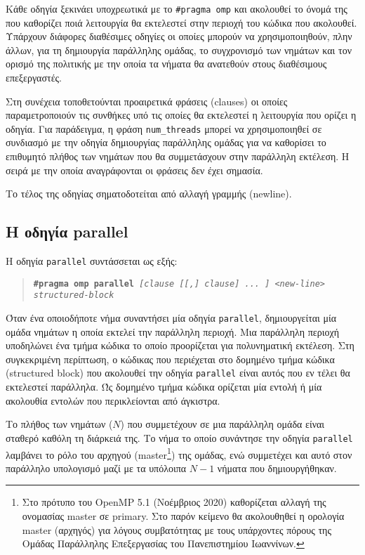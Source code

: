 Κάθε οδηγία ξεκινάει υποχρεωτικά με το \texttt{\#pragma omp} και ακολουθεί το όνομά της που καθορίζει ποιά λειτουργία θα εκτελεστεί στην περιοχή του κώδικα που ακολουθεί. Υπάρχουν διάφορες διαθέσιμες οδηγίες οι οποίες μπορούν να χρησιμοποιηθούν, πλην άλλων, για τη δημιουργία παράλληλης ομάδας, το συγχρονισμό των νημάτων και τον ορισμό της πολιτικής με την οποία τα νήματα θα ανατεθούν στους διαθέσιμους επεξεργαστές.

Στη συνέχεια τοποθετούνται προαιρετικά φράσεις (clauses) οι οποίες παραμετροποιούν τις συνθήκες υπό τις οποίες θα εκτελεστεί η λειτουργία που ορίζει η οδηγία. Για παράδειγμα, η φράση \texttt{num\_threads} μπορεί να χρησιμοποιηθεί σε συνδιασμό με την οδηγία δημιουργίας παράλληλης ομάδας για να καθορίσει το επιθυμητό πλήθος των νημάτων που θα συμμετάσχουν στην παράλληλη εκτέλεση. Η σειρά με την οποία αναγράφονται οι φράσεις δεν έχει σημασία.

Το τέλος της οδηγίας σηματοδοτείται από αλλαγή γραμμής (newline).

\subsection{Η οδηγία parallel}
Η οδηγία \texttt{parallel} συντάσσεται ως εξής:

\begin{quote}
	\texttt{\textbf{\#pragma omp parallel} \textit{[clause [[,] clause] ... ] <new-line>}} \\
		\texttt{\textit{structured-block}}
\end{quote}

Όταν ένα οποιοδήποτε νήμα συναντήσει μία οδηγία \texttt{parallel}, δημιουργείται μία ομάδα νημάτων η οποία εκτελεί την παράλληλη περιοχή. Μια παράλληλη περιοχή υποδηλώνει ένα τμήμα κώδικα το οποίο προορίζεται για πολυνηματική εκτέλεση. Στη συγκεκριμένη περίπτωση, ο κώδικας που περιέχεται στο δομημένο τμήμα κώδικα (structured block) που ακολουθεί την οδηγία \texttt{parallel} είναι αυτός που εν τέλει θα εκτελεστεί παράλληλα. Ώς δομημένο τμήμα κώδικα ορίζεται μία εντολή ή μία ακολουθία εντολών που περικλείονται από άγκιστρα.

Το πλήθος των νημάτων ($N$) που συμμετέχουν σε μια παράλληλη ομάδα είναι σταθερό καθόλη τη διάρκειά της. Το νήμα το οποίο συνάντησε την οδηγία \texttt{parallel} λαμβάνει το ρόλο του αρχηγού (master\footnote{Στο πρότυπο του OpenMP 5.1 (Νοέμβριος 2020) καθορίζεται αλλαγή της ονομασίας master σε primary. Στο παρόν κείμενο θα ακολουθηθεί η ορολογία master (αρχηγός) για λόγους συμβατότητας με τους υπάρχοντες πόρους της Ομάδας Παράλληλης Επεξεργασίας του Πανεπιστημίου Ιωαννίνων.}) της ομάδας, ενώ συμμετέχει και αυτό στον παράλληλο υπολογισμό μαζί με τα υπόλοιπα $N-1$ νήματα που δημιουργήθηκαν.

